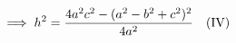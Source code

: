 \documentclass[preview]{standalone}
\begin{document}
\begin{align*}
\special{dvisvgm:raw <g id='unique000'>}\Longrightarrow\; h^2 = \frac{4a^2c^2 - (a^2-b^2+c^2)^2}{4a^2} \special{dvisvgm:raw </g>}\special{dvisvgm:raw <g id='unique001'>}\quad \text{(IV)}\special{dvisvgm:raw </g>}
\end{align*}
\end{document}
